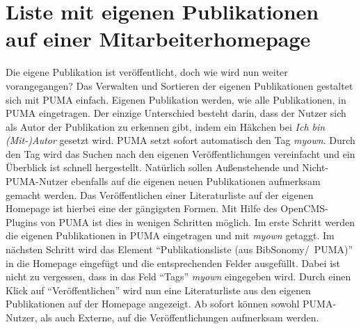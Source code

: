 \section{Liste mit eigenen Publikationen auf einer Mitarbeiterhomepage}
Die eigene Publikation ist veröffentlicht, doch wie wird nun weiter vorangegangen? \newline Das Verwalten und Sortieren der eigenen Publikationen gestaltet sich mit PUMA einfach. Eigenen  Publikation werden, wie alle Publikationen, in PUMA eingetragen. Der einzige Unterschied besteht darin, dass der Nutzer sich als Autor der Publikation zu erkennen gibt, indem ein Häkchen bei \textit{Ich bin (Mit-)Autor} gesetzt wird. PUMA setzt sofort automatisch den Tag \textit{myown}. Durch den Tag wird das Suchen nach den eigenen Veröffentlichungen vereinfacht und ein Überblick ist schnell hergestellt.\newline
Natürlich sollen Außenstehende und Nicht-PUMA-Nutzer ebenfalls auf die eigenen neuen Publikationen aufmerksam gemacht werden. Das Veröffentlichen einer Literaturliste auf der eigenen Homepage ist hierbei eine der gängigsten Formen. Mit Hilfe des OpenCMS-Plugins von PUMA ist dies in wenigen Schritten möglich. Im erste Schritt werden die eigenen Publikationen in PUMA eingetragen und mit \textit{myown} getaggt. Im nächsten Schritt wird das Element \enquote{Publikationsliste (aus BibSonomy/~PUMA)} in die Homepage eingefügt und die  entsprechenden Felder ausgefüllt. Dabei ist nicht zu vergessen, dass in das Feld \enquote{Tags} \textit{myown} eingegeben wird. Durch einen Klick auf \enquote{Veröffentlichen} wird nun eine Literaturliste aus den eigenen Publikationen auf der Homepage angezeigt.  
Ab sofort können sowohl PUMA-Nutzer, als auch Externe, auf die Veröffentlichungen aufmerksam werden.


